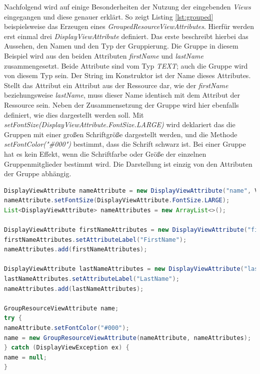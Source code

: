 Nachfolgend wird auf einige Besonderheiten der Nutzung der eingebenden \textit{Views} eingegangen und diese genauer erklärt. So zeigt Listing \ref{lst:grouped} beispielsweise das Erzeugen eines \textit{GroupedResourceViewAttributes}. Hierfür werden erst einmal drei \textit{DisplayViewAttribute} definiert. Das erste beschreibt hierbei das Aussehen, den Namen und den Typ der Gruppierung. Die Gruppe in diesem Beispiel wird aus den beiden Attributen \textit{firstName} und \textit{lastName} zusammengesetzt. Beide Attribute sind vom Typ \textit{TEXT}; auch die Gruppe wird von diesem Typ sein. Der String im Konstruktor ist der Name dieses Attributes. Stellt das Attribut ein Attribut aus der Ressource dar, wie der \textit{firstName} beziehungsweise \textit{lastName}, muss dieser Name identisch mit dem Attribut der Ressource sein. Neben der Zusammensetzung der Gruppe wird hier ebenfalls definiert, wie dies dargestellt werden soll. Mit \textit{setFontSize(DisplayViewAttribute.FontSize.LARGE)} wird deklariert das die Gruppen mit einer großen Schriftgröße dargestellt werden, und die Methode \textit{setFontColor("\#000")} bestimmt, dass die Schrift schwarz ist. Bei einer Gruppe hat es kein Effekt, wenn die Schriftfarbe oder Größe der einzelnen Gruppenmitglieder bestimmt wird. Die Darstellung ist einzig von den Attributen der Gruppe abhängig.

\begin{lstlisting}[label=lst:grouped,
language=java,
firstnumber=1,
caption=Erstellung eines \textit{GroupedResourceViewAttributes}.]		
DisplayViewAttribute nameAttribute = new DisplayViewAttribute("name", ViewAttribute.AttributeType.TEXT);
nameAttribute.setFontSize(DisplayViewAttribute.FontSize.LARGE);
List<DisplayViewAttribute> nameAttributes = new ArrayList<>();

DisplayViewAttribute firstNameAttributes = new DisplayViewAttribute("firstName", ViewAttribute.AttributeType.TEXT);
firstNameAttributes.setAttributeLabel("FirstName");
nameAttributes.add(firstNameAttributes);

DisplayViewAttribute lastNameAttributes = new DisplayViewAttribute("lastName", ViewAttribute.AttributeType.TEXT);
lastNameAttributes.setAttributeLabel("LastName");
nameAttributes.add(lastNameAttributes);

GroupResourceViewAttribute name;
try {
nameAttribute.setFontColor("#000");
name = new GroupResourceViewAttribute(nameAttribute, nameAttributes);
} catch (DisplayViewException ex) {
name = null;
}
\end{lstlisting}

